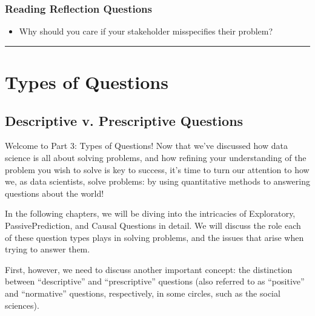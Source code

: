 \documentclass[letterpaper,10pt,english]{jupyterBook}
\begin{document}
\section{Reading Reflection Questions}
\label{\detokenize{20_problems_to_questions/20_stakeholder_management:reading-reflection-questions}}\begin{itemize}
\item {} 
\sphinxAtStartPar
Why should you care if your stakeholder misspecifies their problem?

\end{itemize}


\bigskip\hrule\bigskip


\sphinxstepscope


\part{Types of Questions}

\sphinxstepscope


\chapter{Descriptive v. Prescriptive Questions}
\label{\detokenize{30_questions/05_descriptive_v_prescriptive:descriptive-v-prescriptive-questions}}\label{\detokenize{30_questions/05_descriptive_v_prescriptive::doc}}
\sphinxAtStartPar
Welcome to Part 3: Types of Questions! Now that we’ve discussed how data science is all about solving problems, and how refining your understanding of the problem you wish to solve is key to success, it’s time to turn our attention to how we, as data scientists, solve problems: by using quantitative methods to answering questions about the world!

\sphinxAtStartPar
In the following chapters, we will be diving into the intricacies of Exploratory, Passive\sphinxhyphen{}Prediction, and Causal Questions in detail. We will discuss the role each of these question types plays in solving problems, and the issues that arise when trying to answer them.

\sphinxAtStartPar
First, however, we need to discuss another important concept: the distinction between “descriptive” and “prescriptive” questions (also referred to as “positive” and “normative” questions, respectively, in some circles, such as the social sciences).
\end{document}
